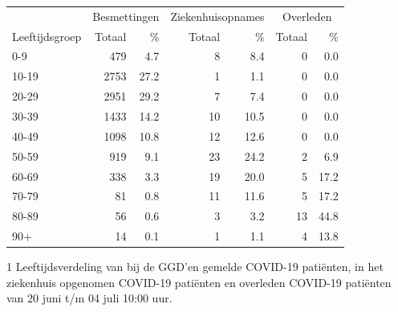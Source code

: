 \documentclass[
  english,
  man,floatsintext]{apa6}
\begin{document}
\begin{table}
\centering\begingroup\fontsize{11}{13}\selectfont

\begin{threeparttable}
\begin{tabular}{lrrrrrr}
\toprule
\multicolumn{1}{c}{ } & \multicolumn{2}{c}{Besmettingen} & \multicolumn{2}{c}{Ziekenhuisopnames} & \multicolumn{2}{c}{Overleden} \\
\cmidrule(l{3pt}r{3pt}){2-3} \cmidrule(l{3pt}r{3pt}){4-5} \cmidrule(l{3pt}r{3pt}){6-7}
Leeftijdsgroep & Totaal & \% & Totaal & \% & Totaal & \%\\
\midrule
0-9 & 479 & 4.7 & 8 & 8.4 & 0 & 0.0\\
10-19 & 2753 & 27.2 & 1 & 1.1 & 0 & 0.0\\
20-29 & 2951 & 29.2 & 7 & 7.4 & 0 & 0.0\\
30-39 & 1433 & 14.2 & 10 & 10.5 & 0 & 0.0\\
40-49 & 1098 & 10.8 & 12 & 12.6 & 0 & 0.0\\
50-59 & 919 & 9.1 & 23 & 24.2 & 2 & 6.9\\
60-69 & 338 & 3.3 & 19 & 20.0 & 5 & 17.2\\
70-79 & 81 & 0.8 & 11 & 11.6 & 5 & 17.2\\
80-89 & 56 & 0.6 & 3 & 3.2 & 13 & 44.8\\
90+ & 14 & 0.1 & 1 & 1.1 & 4 & 13.8\\
\bottomrule
\end{tabular}
\begin{tablenotes}
\item[1] Leeftijdsverdeling van bij de GGD’en gemelde COVID-19 patiënten, in het ziekenhuis opgenomen COVID-19 patiënten en overleden COVID-19 patiënten van 20 juni t/m 04 juli 10:00 uur.
\end{tablenotes}
\end{threeparttable}
\endgroup{}
\end{table}

\newpage
\end{document}
